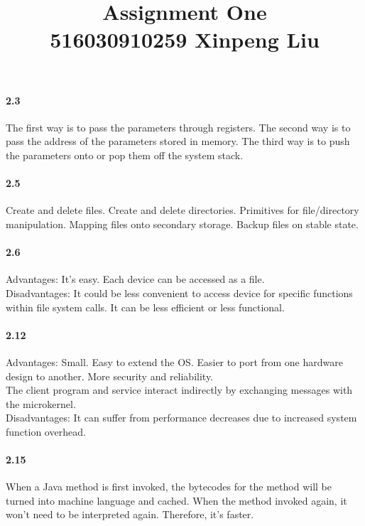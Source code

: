\documentclass[12pt,a4]{article}
\date{}
\title{
	Assignment One \\
	\vspace{3mm}
	{\normalsize 516030910259 \textbf{Xinpeng Liu}}
}
\begin{document}
    \maketitle
	\paragraph{2.3} The first way is to pass the parameters through registers. The second way is to pass the address of the parameters stored in memory. The third way is to push the parameters onto or pop them off the system stack.
	\paragraph{2.5} Create and delete files. Create and delete directories. Primitives for file/directory manipulation. Mapping files onto secondary storage. Backup files on stable state.
	\paragraph{2.6} 
		Advantages: It's easy. Each device can be accessed as a file.\\
		Disadvantages: It could be less convenient to access device for specific functions within file system calls. It can be less efficient or less functional.
	\paragraph{2.12} 
		Advantages: Small. Easy to extend the OS. Easier to port from one hardware design to another. More security and reliability.\\
		The client program and service interact indirectly by exchanging messages with the microkernel.\\
		Disadvantages: It can suffer from performance decreases due to increased system function overhead.
	\paragraph{2.15}
		When a Java method is first invoked, the bytecodes for the method will be turned into machine language and cached. When the method invoked again, it won't need to be interpreted again. Therefore, it's faster.
\end{document}
